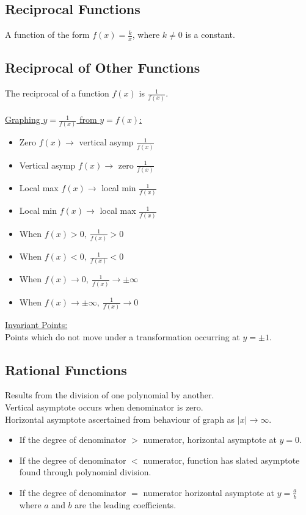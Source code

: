 \documentclass[10pt, a4paper, titlepage]{article}
\begin{document}
\begin{multicols*}{3}
	\subsection{Reciprocal Functions}
	A function of the form $f(x)=\frac{k}{x}$, where $k\neq 0$ is a constant.

	\dotfill
	\subsection{Reciprocal of Other Functions}
	The reciprocal of a function $f(x)$ is $\frac{1}{f(x)}$.\\\\
	\underline{Graphing $y=\frac{1}{f(x)}$ from $y=f(x)$:}
	\begin{itemize}
		\item Zero $f(x)\to$ vertical asymp $\frac{1}{f(x)}$
		\item Vertical asymp $f(x)\to$ zero $\frac{1}{f(x)}$
		\item Local max $f(x)\to$ local min $\frac{1}{f(x)}$
		\item Local min $f(x)\to$ local max $\frac{1}{f(x)}$
		\item When $f(x)>0,\ \frac{1}{f(x)}>0$
		\item When $f(x)<0,\ \frac{1}{f(x)}<0$
		\item When $f(x)\to 0,\ \frac{1}{f(x)}\to \pm \infty$
		\item When $f(x)\to \pm \infty,\ \frac{1}{f(x)}\to 0$
	\end{itemize}
	\underline{Invariant Points:}
	\\Points which do not move under a transformation occurring at $y=\pm 1$.

	\dotfill
	\subsection{Rational Functions}
	Results from the division of one polynomial by another.\\
	Vertical asymptote occurs when denominator is zero.\\
	Horizontal asymptote ascertained from behaviour of graph as $|x|\to \infty$.
	\begin{itemize}
		\item If the degree of denominator $>$ numerator, horizontal asymptote at $y=0$.
		\item If the degree of denominator $<$ numerator, function has slated asymptote found through polynomial division.
		\item If the degree of denominator $=$ numerator horizontal asymptote at $y=\frac{a}{b}$ where $a$ and $b$ are the leading coefficients.
	\end{itemize}


\end{multicols*}
\end{document}
